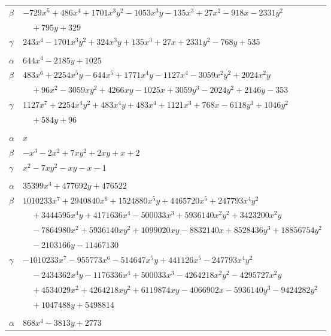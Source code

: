\documentclass[11pt]{article}
\begin{document}
\begin{longtable}{@{}ll@{}}
$\beta$ & $-729x^{5}+486x^{4}+1701x^{3}y^{2}-1053x^{3}y-135x^{3}+27x^{2}-918x-2331y^{2}$\\
 & $\quad +795y+329$\\
$\gamma$ & $243x^{4}-1701x^{3}y^{2}+324x^{3}y+135x^{3}+27x+2331y^{2}-768y+535$\\
\addlinespace[3pt]
\multicolumn{2}{@{}l}{$\{i,j\}=\{11,14\}$, $k_{ij}=2^{8}\cdot 3$}\\
$\alpha$ & $644x^{4}-2185y+1025$\\
$\beta$ & $483x^{6}+2254x^{5}y-644x^{5}+1771x^{4}y-1127x^{4}-3059x^{2}y^{2}+2024x^{2}y$\\
 & $\quad +96x^{2}-3059xy^{2}+4266xy-1025x+3059y^{3}-2024y^{2}+2146y-353$\\
$\gamma$ & $1127x^{7}+2254x^{4}y^{2}+483x^{4}y+483x^{4}+1121x^{3}+768x-6118y^{3}+1046y^{2}$\\
 & $\quad +584y+96$\\
\addlinespace[3pt]
\multicolumn{2}{@{}l}{$\{i,j\}=\{11,17\}$, $k_{ij}=1$}\\
$\alpha$ & $x$\\
$\beta$ & $-x^{3}-2x^{2}+7xy^{2}+2xy+x+2$\\
$\gamma$ & $x^{2}-7xy^{2}-xy-x-1$\\
\addlinespace[3pt]
\multicolumn{2}{@{}l}{$\{i,j\}=\{11,20\}$, $k_{ij}=2^{2}\cdot 3^{3}\cdot 5\cdot 13$}\\
$\alpha$ & $35399x^{4}+477692y+476522$\\
$\beta$ & $1010233x^{7}+2940840x^{6}+1524880x^{5}y+4465720x^{5}+247793x^{4}y^{2}$\\
 & $\quad +3444595x^{4}y+4171636x^{4}-500033x^{3}+5936140x^{2}y^{2}+3423200x^{2}y$\\
 & $\quad -7864980x^{2}+5936140xy^{2}+1099020xy-8832140x+8528436y^{3}+18856754y^{2}$\\
 & $\quad -2103166y-11467130$\\
$\gamma$ & $-1010233x^{7}-955773x^{6}-514647x^{5}y+441126x^{5}-247793x^{4}y^{2}$\\
 & $\quad -2434362x^{4}y-1176336x^{4}+500033x^{3}-4264218x^{2}y^{2}-4295727x^{2}y$\\
 & $\quad +4534029x^{2}+4264218xy^{2}+6119874xy-4066902x-5936140y^{3}-9424282y^{2}$\\
 & $\quad +1047488y+5498814$\\
\addlinespace[3pt]
\multicolumn{2}{@{}l}{$\{i,j\}=\{12,15\}$, $k_{ij}=2^{3}\cdot 3^{2}\cdot 11^{2}$}\\
$\alpha$ & $868x^{4}-3813y+2773$\\

\end{longtable}
\end{document}
